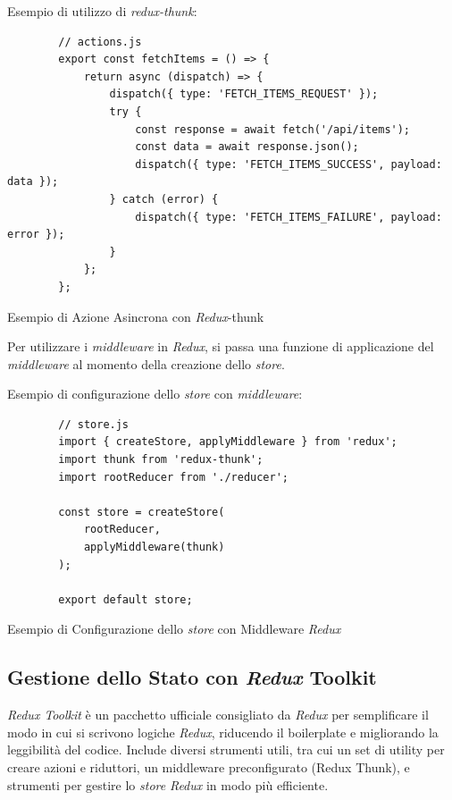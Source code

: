 Esempio di utilizzo di \textit{redux-thunk}:
\begin{listing}[H]
    \begin{verbatim}
        // actions.js
        export const fetchItems = () => {
            return async (dispatch) => {
                dispatch({ type: 'FETCH_ITEMS_REQUEST' });
                try {
                    const response = await fetch('/api/items');
                    const data = await response.json();
                    dispatch({ type: 'FETCH_ITEMS_SUCCESS', payload: data });
                } catch (error) {
                    dispatch({ type: 'FETCH_ITEMS_FAILURE', payload: error });
                }
            };
        };
    \end{verbatim}
    \caption{Esempio di Azione Asincrona con \textit{Redux}-thunk}
    \label{listing:azione_thunk}
\end{listing}

Per utilizzare i \textit{middleware} in \textit{Redux}, si passa una funzione di applicazione del \textit{middleware} al momento della creazione dello \textit{store}.

Esempio di configurazione dello \textit{store} con \textit{middleware}:
\begin{listing}[H]
    \begin{verbatim}
        // store.js
        import { createStore, applyMiddleware } from 'redux';
        import thunk from 'redux-thunk';
        import rootReducer from './reducer';

        const store = createStore(
            rootReducer,
            applyMiddleware(thunk)
        );

        export default store;
    \end{verbatim}
    \caption{Esempio di Configurazione dello \textit{store} con Middleware \textit{Redux}}
    \label{listing:store}
\end{listing}

\subsection{Gestione dello Stato con \textit{Redux} Toolkit}
\label{subsec:redux_toolkit}

\textit{Redux Toolkit} è un pacchetto ufficiale consigliato da \textit{Redux} per semplificare il modo in cui si scrivono logiche \textit{Redux}, riducendo il boilerplate e migliorando la leggibilità del codice.
Include diversi strumenti utili, tra cui un set di utility per creare azioni e riduttori, un middleware preconfigurato (Redux Thunk), e strumenti per gestire lo \textit{store} \textit{Redux} in modo più efficiente.

